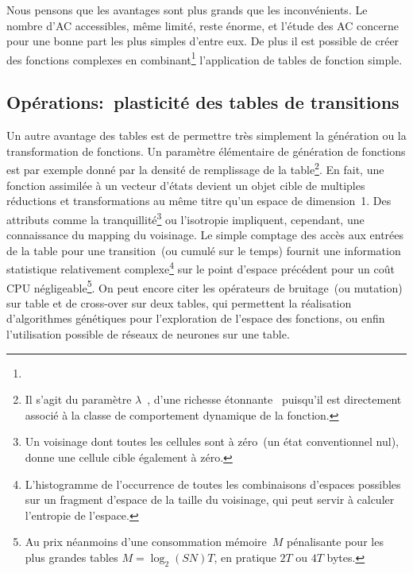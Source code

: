 Nous pensons que les avantages sont plus grands que les inconvénients. %
Le nombre d'AC accessibles, même limité, reste énorme, et l'étude des
AC concerne pour une bonne part les plus simples d'entre eux. %
De plus il est possible de créer des fonctions complexes
en combinant\footnote{%
  } %
l'application de tables de fonction simple. %

\subsection{Opérations:~plasticité des tables de transitions}

Un autre avantage des tables est de permettre très simplement la
génération ou la transformation de fonctions. %
Un paramètre élémentaire de génération de fonctions est par exemple
donné par la densité de remplissage de la table\footnote{%
  Il s'agit du paramètre $\lambda$~\cite{Langton92b}, d'une richesse
  étonnante~ puisqu'il est directement associé
  à la classe de comportement dynamique de la fonction.}. %
En fait, une fonction assimilée à un vecteur d'états devient un objet
cible de multiples réductions et transformations au même titre qu'un
espace de dimension~1. %
Des attributs comme la tranquillité\footnote{%
  Un voisinage dont toutes les cellules sont à zéro~(un état
  conventionnel nul), donne une cellule cible également à zéro.} %
ou l'isotropie impliquent, cependant, une connaissance du mapping
 du voisinage. %
Le simple comptage des accès aux entrées de la table pour une
transition~(ou cumulé sur le temps) fournit une information
statistique relativement complexe\footnote{%
  L'histogramme de l'occurrence de toutes les combinaisons d'espaces
  possibles sur un fragment d'espace de la taille du voisinage,
  qui peut servir à calculer l'entropie de l'espace.} %
sur le point d'espace précédent pour un coût CPU
négligeable\footnote{%
  Au prix néanmoins d'une consommation mémoire~$M$ pénalisante pour
  les plus grandes tables %
  $M = \log_{2}(SN)T$, en pratique $2 T$ ou $4 T$ bytes.}. %
On peut encore citer les opérateurs de bruitage~(ou mutation) sur
table et de cross-over sur deux tables, qui permettent la réalisation
d'algorithmes génétiques pour l'exploration de l'espace des fonctions,
ou enfin l'utilisation possible de réseaux de neurones sur une
table. %

